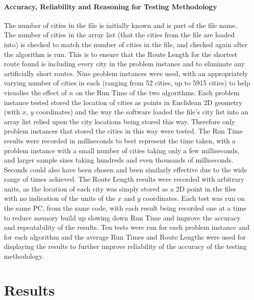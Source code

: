 \documentclass[conference,backref=page]{acmsiggraph}
\begin{document}
\paragraph{Accuracy, Reliability and Reasoning for Testing Methodology}
 The number of cities in the file is initially known and is part of the file name. The number of cities in the array list (that the cities from the file are loaded into) is checked to match the number of cities in the file, and checked again after the algorithm is run. This is to ensure that the Route Length for the shortest route found is including every city in the problem instance and to eliminate any artificially short routes. Nine problem instances were used, with an appropriately varying number of cities in each (ranging from 52 cities, up to 5915 cities) to help visualise the effect of $n$ on the Run Time of the two algorithms. Each problem instance tested stored the location of cities as points in Euclidean 2D geometry (with $x$, $y$ coordinates) and the way the software loaded the file's city list into an array list relied upon the city locations being stored this way. Therefore only problem instances that stored the cities in this way were tested. The Run Time results were recorded in milliseconds to best represent the time taken, with a problem instance with a small number of cities taking only a few milliseconds, and larger sample sizes taking hundreds and even thousands of milliseconds. Seconds could also have been chosen and been similarly effective due to the wide range of times achieved. The Route Length results were recorded with arbitrary units, as the location of each city was simply stored as a 2D point in the files with no indication of the units of the $x$ and $y$ coordinates. Each test was run on the same PC, from the same code, with each result being recorded one at a time to reduce memory build up slowing down Run Time and improve the accuracy and repeatability of the results. Ten tests were run for each problem instance and for each algorithm and the average Run Times and Route Lengths were used for displaying the results to further improve reliability of the accuracy of the testing methodology.


\section{Results}
\end{document}
